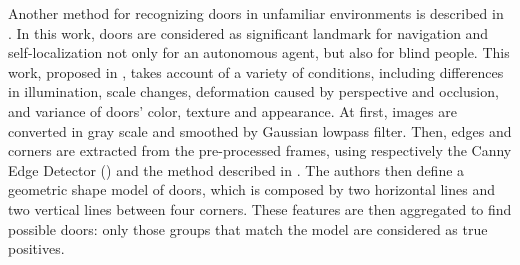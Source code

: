   Another method for recognizing doors in unfamiliar environments is described in \cite{edgeandcornerdoorsdetector}. In this work, doors are considered as significant landmark for navigation and self-localization not only for an autonomous agent, but also for blind people. This work, proposed in \citeauthor{edgeandcornerdoorsdetector}, takes account of a variety of conditions, including differences in illumination, scale changes, deformation caused by perspective and occlusion, and variance of doors’ color, texture and appearance. At first, images are converted in gray scale and smoothed by Gaussian lowpass filter. Then, edges and corners are extracted from the pre-processed frames, using respectively the Canny Edge Detector (\cite{canny}) and the method described in \cite{cornerdetector}. The authors then define a geometric shape model of doors, which is composed by two horizontal lines and two vertical lines between four corners. These features are then aggregated to find possible doors: only those groups that match the model are considered as true positives.  
 
